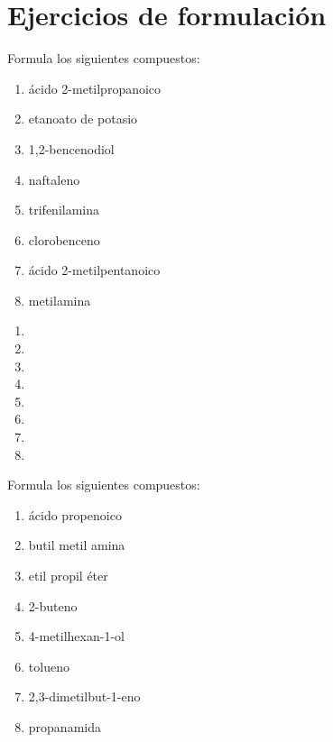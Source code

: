 \section{Ejercicios de formulación}

\begin{exercise}[
    tags    = {orgánica,nomenclatura,múltiple,2B},
    topics  = {química orgánica,formulación,nomenclatura},
    source  = {Química 2B SAN 2016, p391, e17},
  ]
  Formula los siguientes compuestos:

  \begin{enumerate}
    \item ácido 2-metilpropanoico
    \item etanoato de potasio
    \item 1,2-bencenodiol
    \item naftaleno
    \item trifenilamina
    \item clorobenceno
    \item ácido 2-metilpentanoico
    \item metilamina
  \end{enumerate}
\end{exercise}

\begin{solution}
  \begin{enumerate}
    \item {}
    \item {}
    \item {}
    \item {}
    \item {}
    \item {}
    \item {}
    \item {}
  \end{enumerate}
\end{solution}


\begin{exercise}[
    tags    = {orgánica,nomenclatura,múltiple,2B},
    topics  = {química orgánica,formulación,nomenclatura},
    source  = {Química 2B SAN 2016, p391, e17},
  ]
  Formula los siguientes compuestos:

  \begin{enumerate}
    \item ácido propenoico
    \item butil metil amina
    \item etil propil éter
    \item 2-buteno
    \item 4-metilhexan-1-ol
    \item tolueno
    \item 2,3-dimetilbut-1-eno
    \item propanamida
  \end{enumerate}
\end{exercise}

